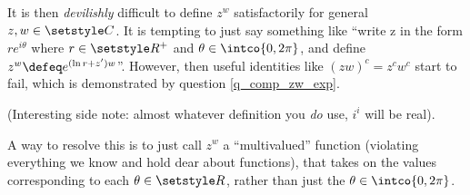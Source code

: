 It is then \emph{devilishly} difficult to define \(z^w\) satisfactorily for
general \(z, w \in \Complex\). It is tempting to just say something like ``write
z in the form \(re^{i\theta}\) where \(r \in \Reals^+\) and
\(\theta \in \intco{0, 2\pi}\), and define \(z^w \defeq e^{(\ln r + z')w}\)''.
However, then useful identities like \((zw)^c = z^c w^c\) start to fail, which
is demonstrated by question \ref{q_comp_zw_exp}.

(Interesting side note: almost whatever definition you \emph{do} use, \(i^i\)
will be real).

A way to resolve this is to just call \(z^w\) a ``multivalued'' function
(violating everything we know and hold dear about functions), that takes on
the values corresponding to each \(\theta \in \Reals\), rather than just the
\(\theta \in \intco{0, 2\pi}\).
